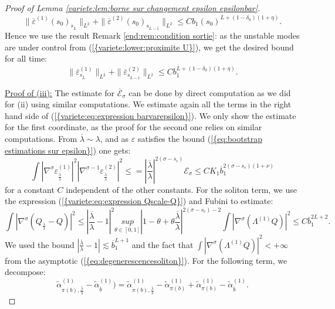 \documentclass[11pt,a4paper,reqno]{amsart}
\theoremstyle{remark}
\numberwithin{equation}{section}
\begin{document}
\begin{proof}[Proof of Lemma \ref{variete:lem:borne sur changement epsilon epsilonbar}]
$$
\parallel {{\overline {\varepsilon}}}^{(1)}(s_0)_{s_{{{\overline {L}}}}} \parallel_{L^2} +\parallel {{\overline {\varepsilon}}}^{(2)}(s_0)_{s_{{{\overline {L}}}-1}} \parallel_{L^2} \leq Cb_1(s_0)^{{{\overline {L}}}+(1-\delta_0)(1+\eta)}.
$$
Hence we use the result Remark \ref{end:rem:condition sortie}: as the unstable modes are under control from {{\rm (\ref{{variete:lower:proximite U}})}}, we get the desired bound for all time:
$$
\parallel {{\overline {\varepsilon}}}^{(1)}_{s_{{{\overline {L}}}}} \parallel_{L^2} +\parallel {{\overline {\varepsilon}}}^{(2)}_{s_{{{\overline {L}}}-1}} \parallel_{L^2} \leq Cb_1^{{{\overline {L}}}+(1-\delta_0)(1+\eta)}.
$$

\underline{Proof of (iii):} The estimate for $\overline{\mathcal{E}}_{\sigma}$ can be done by direct computation as we did for (ii) using similar computations. We estimate again all the terms in the right hand side of {{\rm (\ref{{variete:eq:expression barvarepsilon}})}}. We only show the estimate for the first coordinate, as the proof for the second one relies on similar computations. From ${{\overline {\lambda}}}\sim \lambda$, and as $\varepsilon$ satisfies the bound {{\rm (\ref{{eq:bootstrap estimations sur epsilon}})}} one gets:
$$
\int |\nabla^{\sigma}\varepsilon_{\frac{{{\overline {\lambda}}}}{\lambda}}^{(1)}|^2 |\nabla^{\sigma-1}\varepsilon_{\frac{{{\overline {\lambda}}}}{\lambda}}^{(2)}|^2\leq = \left|\frac{{{\overline {\lambda}}}}{\lambda}\right|^{2(\sigma-s_c)}\mathcal{E}_{\sigma}\leq CK_1 {{\overline {b}}}_1^{2(\sigma-s_c)(1+\nu)}
$$
for a constant $C$ independent of the other constants. For the soliton term, we use the expression {{\rm (\ref{{variete:eq:expression Qscale-Q}})}} and Fubini to estimate:
$$
\int |\nabla^{\sigma}(Q_{\frac{{{\overline {\lambda}}}}{\lambda}}-Q)|^2 \leq \left|\frac{{{\overline {\lambda}}}}{\lambda}-1\right|^2 \underset{\theta\in [0,1] }{sup} \left|1-\theta+\theta\frac{{{\overline {\lambda}}}}{\lambda}\right|^{2(\sigma-s_c)-2} \int |\nabla^{\sigma}(\Lambda^{(1)}Q)|^2\leq C {{\overline {b}}}_1^{2L+2}.
$$
We used the bound $|\frac{{{\overline {\lambda}}}}{\lambda}-1|\lesssim {{\overline {b}}}_1^{L+1}$ and the fact that $ \int |\nabla^{\sigma}(\Lambda^{(1)}Q)|^2 <+\infty$ from the asymptotic {{\rm (\ref{{eq:degenerescencesoliton}})}}. For the following term, we decompose:
$$
\tilde{\alpha}_{\pi(b),\frac{{{\overline {\lambda}}}}{\lambda}}^{(1)}-\tilde{\alpha}_{{{\overline {b}}}}^{(1)})= \tilde{\alpha}_{\pi(b),\frac{{{\overline {\lambda}}}}{\lambda}}^{(1)}-\tilde{\alpha}_{\pi(b)}^{(1)}+ \tilde{\alpha}_{\pi(b)}^{(1)}-\tilde{\alpha}_{{{\overline {b}}}}^{(1)}.
$$
\end{proof}
\end{document}
